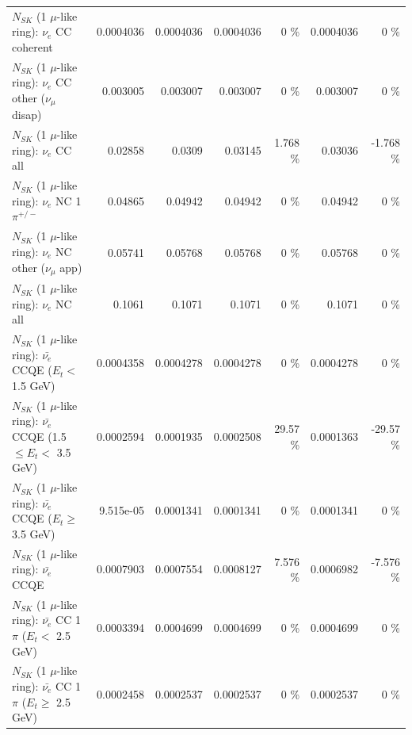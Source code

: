\begin{table}
\begin{tabular}{| l | r | r | r  r | r  r |}
                               $N_{SK}$ (1 $\mu$-like ring): $\nu_e$ CC coherent &       0.0004036 &       0.0004036 &       0.0004036 &        0 \%  &       0.0004036 &        0 \%  \\ 
                $N_{SK}$ (1 $\mu$-like ring): $\nu_e$ CC other ($\nu_\mu$ disap) &        0.003005 &        0.003007 &        0.003007 &        0 \%  &        0.003007 &        0 \%  \\ 
                                  $N_{SK}$ (1 $\mu$-like ring): $\nu_{e}$ CC all &         0.02858 &          0.0309 &         0.03145 &    1.768 \%  &         0.03036 &   -1.768 \%  \\ 
\hline
                           $N_{SK}$ (1 $\mu$-like ring): $\nu_e$ NC 1$\pi^{+/-}$ &         0.04865 &         0.04942 &         0.04942 &        0 \%  &         0.04942 &        0 \%  \\ 
                  $N_{SK}$ (1 $\mu$-like ring): $\nu_e$ NC other ($\nu_\mu$ app) &         0.05741 &         0.05768 &         0.05768 &        0 \%  &         0.05768 &        0 \%  \\ 
                                  $N_{SK}$ (1 $\mu$-like ring): $\nu_{e}$ NC all &          0.1061 &          0.1071 &          0.1071 &        0 \%  &          0.1071 &        0 \%  \\ 
\hline
\hline
\hline
            $N_{SK}$ (1 $\mu$-like ring): $\bar{\nu_e}$ CCQE ($E_{t} <$ 1.5 GeV) &       0.0004358 &       0.0004278 &       0.0004278 &        0 \%  &       0.0004278 &        0 \%  \\ 
   $N_{SK}$ (1 $\mu$-like ring): $\bar{\nu_e}$ CCQE (1.5 $\leq E_{t} <$ 3.5 GeV) &       0.0002594 &       0.0001935 &       0.0002508 &    29.57 \%  &       0.0001363 &   -29.57 \%  \\ 
         $N_{SK}$ (1 $\mu$-like ring): $\bar{\nu_e}$ CCQE ($E_{t} \geq$ 3.5 GeV) &       9.515e-05 &       0.0001341 &       0.0001341 &        0 \%  &       0.0001341 &        0 \%  \\ 
\hline
                                $N_{SK}$ (1 $\mu$-like ring): $\bar{\nu_e}$ CCQE &       0.0007903 &       0.0007554 &       0.0008127 &    7.576 \%  &       0.0006982 &   -7.576 \%  \\ 
\hline
       $N_{SK}$ (1 $\mu$-like ring): $\bar{\nu_e}$ CC 1$\pi$ ($E_{t} <$ 2.5 GeV) &       0.0003394 &       0.0004699 &       0.0004699 &        0 \%  &       0.0004699 &        0 \%  \\ 
    $N_{SK}$ (1 $\mu$-like ring): $\bar{\nu_e}$ CC 1$\pi$ ($E_{t} \geq$ 2.5 GeV) &       0.0002458 &       0.0002537 &       0.0002537 &        0 \%  &       0.0002537 &        0 \%  \\ 

\end{tabular}
\end{table}

